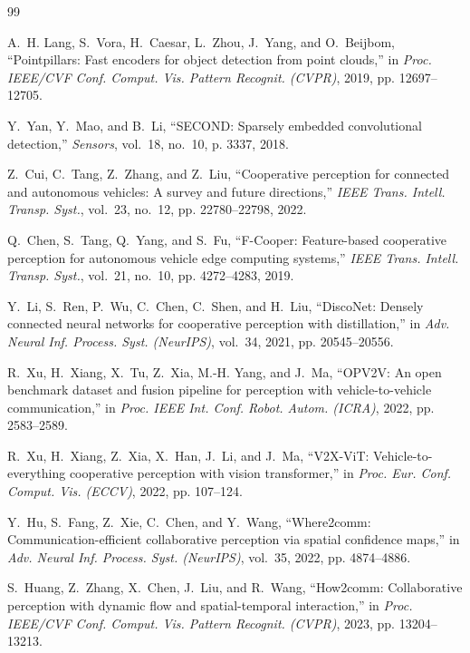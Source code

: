 \documentclass[10pt,journal,compsoc]{IEEEtran}
\begin{document}
\begin{thebibliography}{99}

A.~H. Lang, S.~Vora, H.~Caesar, L.~Zhou, J.~Yang, and O.~Beijbom, ``Pointpillars: Fast encoders for object detection from point clouds,'' in \emph{Proc. IEEE/CVF Conf. Comput. Vis. Pattern Recognit. (CVPR)}, 2019, pp. 12697--12705.

Y.~Yan, Y.~Mao, and B.~Li, ``SECOND: Sparsely embedded convolutional detection,'' \emph{Sensors}, vol.~18, no.~10, p. 3337, 2018.

Z.~Cui, C.~Tang, Z.~Zhang, and Z.~Liu, ``Cooperative perception for connected and autonomous vehicles: A survey and future directions,'' \emph{IEEE Trans. Intell. Transp. Syst.}, vol.~23, no.~12, pp. 22780--22798, 2022.

Q.~Chen, S.~Tang, Q.~Yang, and S.~Fu, ``F-Cooper: Feature-based cooperative perception for autonomous vehicle edge computing systems,'' \emph{IEEE Trans. Intell. Transp. Syst.}, vol.~21, no.~10, pp. 4272--4283, 2019.

Y.~Li, S.~Ren, P.~Wu, C.~Chen, C.~Shen, and H.~Liu, ``DiscoNet: Densely connected neural networks for cooperative perception with distillation,'' in \emph{Adv. Neural Inf. Process. Syst. (NeurIPS)}, vol.~34, 2021, pp. 20545--20556.

R.~Xu, H.~Xiang, X.~Tu, Z.~Xia, M.-H. Yang, and J.~Ma, ``OPV2V: An open benchmark dataset and fusion pipeline for perception with vehicle-to-vehicle communication,'' in \emph{Proc. IEEE Int. Conf. Robot. Autom. (ICRA)}, 2022, pp. 2583--2589.

R.~Xu, H.~Xiang, Z.~Xia, X.~Han, J.~Li, and J.~Ma, ``V2X-ViT: Vehicle-to-everything cooperative perception with vision transformer,'' in \emph{Proc. Eur. Conf. Comput. Vis. (ECCV)}, 2022, pp. 107--124.

Y.~Hu, S.~Fang, Z.~Xie, C.~Chen, and Y.~Wang, ``Where2comm: Communication-efficient collaborative perception via spatial confidence maps,'' in \emph{Adv. Neural Inf. Process. Syst. (NeurIPS)}, vol.~35, 2022, pp. 4874--4886.

S.~Huang, Z.~Zhang, X.~Chen, J.~Liu, and R.~Wang, ``How2comm: Collaborative perception with dynamic flow and spatial-temporal interaction,'' in \emph{Proc. IEEE/CVF Conf. Comput. Vis. Pattern Recognit. (CVPR)}, 2023, pp. 13204--13213.


\end{thebibliography}
\end{document}
